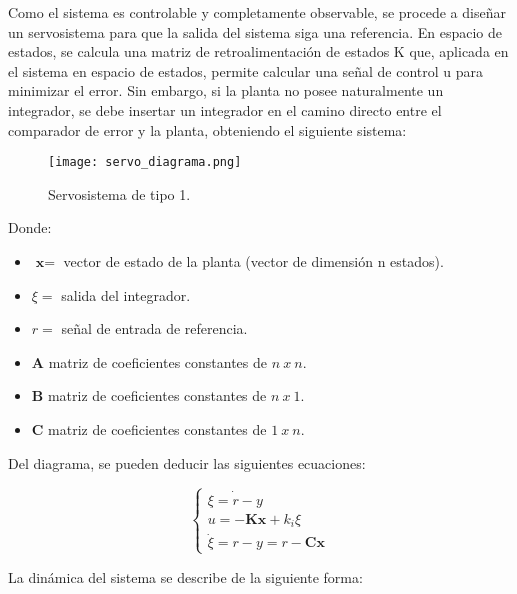 Como el sistema es controlable y completamente observable, se procede a diseñar un servosistema para que la
salida del sistema siga una referencia. En espacio de estados, se calcula una matriz de retroalimentación de estados
K que, aplicada en el sistema en espacio de estados, permite calcular una señal de control u para minimizar el error.
Sin embargo, si la planta no posee naturalmente un integrador, se debe insertar un integrador
en el camino directo entre el comparador de error y la planta, obteniendo el siguiente sistema:

\begin{figure}[H]
    \centering
    \texttt{[image: servo\_diagrama.png]}
    \vspace{-0.25cm}
    \caption{Servosistema de tipo 1.}
    \label{fig:servo_diagrama}
\end{figure}
\vspace{-0.5cm}

Donde:

\begin{itemize}[noitemsep]
    \item $\textbf{x} =$ vector de estado de la planta (vector de dimensión n estados).
    \item $\xi =$ salida del integrador.
    \item $r =$ señal de entrada de referencia.
    \item $\textbf{A}$ matriz de coeficientes constantes de $n\ x\ n$.
    \item $\textbf{B}$ matriz de coeficientes constantes de $n\ x\ 1$.
    \item $\textbf{C}$ matriz de coeficientes constantes de $1\ x\ n$.
\end{itemize}

Del diagrama, se pueden deducir las siguientes ecuaciones:

\vspace{-0.5cm}
\begin{equation}
    \begin{cases}
        \dot{\xi = r - y}
        \\
        u = -\textbf{K} \textbf{x} + k_i \xi
        \\
        \dot{\xi} = r - y = r - \textbf{C} \textbf{x}
    \end{cases}
\end{equation}

La dinámica del sistema se describe de la siguiente forma:

